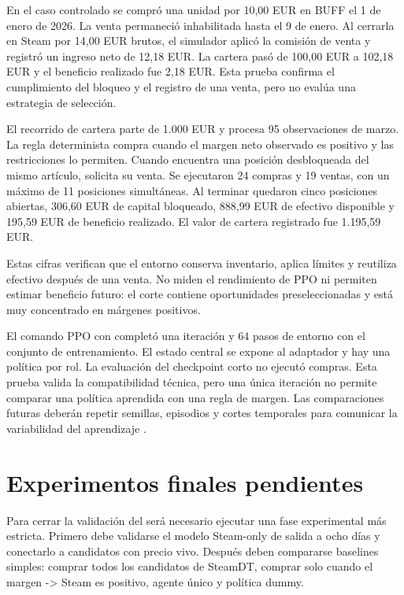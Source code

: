 En el caso controlado se compró una unidad por 10,00 EUR en BUFF el 1 de enero de 2026. La venta permaneció inhabilitada hasta el 9 de enero. Al cerrarla en Steam por 14,00 EUR brutos, el simulador aplicó la comisión de venta y registró un ingreso neto de 12,18 EUR. La cartera pasó de 100,00 EUR a 102,18 EUR y el beneficio realizado fue 2,18 EUR. Esta prueba confirma el cumplimiento del bloqueo y el registro de una venta, pero no evalúa una estrategia de selección.

El recorrido de cartera parte de 1.000 EUR y procesa 95 observaciones de marzo. La regla determinista compra cuando el margen neto observado es positivo y las restricciones lo permiten. Cuando encuentra una posición desbloqueada del mismo artículo, solicita su venta. Se ejecutaron 24 compras y 19 ventas, con un máximo de 11 posiciones simultáneas. Al terminar quedaron cinco posiciones abiertas, 306,60 EUR de capital bloqueado, 888,99 EUR de efectivo disponible y 195,59 EUR de beneficio realizado. El valor de cartera registrado fue 1.195,59 EUR.

Estas cifras verifican que el entorno conserva inventario, aplica límites y reutiliza efectivo después de una venta. No miden el rendimiento de PPO ni permiten estimar beneficio futuro: el corte contiene oportunidades preseleccionadas y está muy concentrado en márgenes positivos.

El comando PPO con  completó una iteración y 64 pasos de entorno con el conjunto de entrenamiento. El estado central se expone al adaptador y hay una política por rol. La evaluación del checkpoint corto no ejecutó compras. Esta prueba valida la compatibilidad técnica, pero una única iteración no permite comparar una política aprendida con una regla de margen. Las comparaciones futuras deberán repetir semillas, episodios y cortes temporales para comunicar la variabilidad del aprendizaje \cite{agarwal2021deep}.

\section{Experimentos finales pendientes}

Para cerrar la validación del  será necesario ejecutar una fase experimental más estricta. Primero debe validarse el modelo Steam-only de salida a ocho días y conectarlo a candidatos con precio  vivo. Después deben compararse baselines simples: comprar todos los candidatos de SteamDT, comprar solo cuando el margen  -> Steam es positivo, agente único y política dummy.

